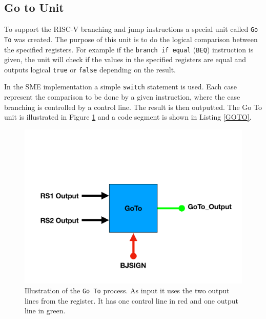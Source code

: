     \subsection{Go to Unit}
        To support the RISC-V branching and jump instructions a special unit called \texttt{Go To} was created. The purpose of this unit is to do the logical comparison between the specified registers. For example if the \texttt{branch if equal} (\texttt{BEQ}) instruction is given, the unit will check if the values in the specified registers are equal and outputs logical \texttt{true} or \texttt{false} depending on the result.
        
        In the SME implementation a simple \texttt{switch} statement is used. Each case represent the comparison to be done by a given instruction, where the case branching is controlled by a control line. The result is then outputted. The Go To unit is illustrated in Figure \ref{fig:GOTO} and a code segment is shown in Listing \ref{GOTO}.
        
        
        \begin{figure}[h!]
            \centering
            \includegraphics[scale=0.35]{pictures/GOTO.pdf}
            \caption{Illustration of the \texttt{Go To} process. As input it uses the two output lines from the register. It has one control line in red and one output line in green.}
            \label{fig:GOTO}
        \end{figure}
    

